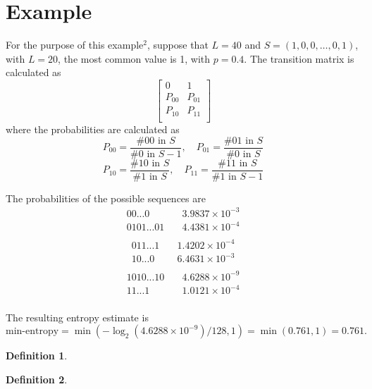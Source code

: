 \documentclass[12pt,openany]{book}
\theoremstyle{definition}
\newtheorem{definition}{Definition}[chapter]
\begin{document}
\section*{Example}
For the purpose of this example\(^2\), suppose that \(L = 40\) and \(S = (1, 0, 0, \ldots, 0, 1)\), with \(L = 20\), the most common value is 1, with \(p = 0.4\). The transition matrix is calculated as
\[
\begin{bmatrix}
	0 & 1 \\
	P_{00} & P_{01} \\
	P_{10} & P_{11} \\
\end{bmatrix}
\]
where the probabilities are calculated as
\[
P_{00} = \frac{\#00 \text{ in } S}{\#0 \text{ in } S - 1}, \quad P_{01} = \frac{\#01 \text{ in } S}{\#0 \text{ in } S}
\]
\[
P_{10} = \frac{\#10 \text{ in } S}{\#1 \text{ in } S}, \quad P_{11} = \frac{\#11 \text{ in } S}{\#1 \text{ in } S - 1}
\]

The probabilities of the possible sequences are
\[
\begin{aligned}
	00...0 &\quad 3.9837 \times 10^{-3} \\
	0101...01 &\quad 4.4381 \times 10^{-4} \\
\end{aligned}
\]
\[
\begin{aligned}
	011...1 &\quad 1.4202 \times 10^{-4} \\
	10...0 &\quad 6.4631 \times 10^{-3} \\
\end{aligned}
\]
\[
\begin{aligned}
	1010...10 &\quad 4.6288 \times 10^{-9} \\
	11...1 &\quad 1.0121 \times 10^{-4} \\
\end{aligned}
\]

The resulting entropy estimate is
\[ \text{min-entropy} = \min(-\log_2(4.6288 \times 10^{-9})/128, 1) = \min(0.761, 1) = 0.761. \]

\newpage

\begin{tcolorbox}[colback=white,colframe=defcolor,arc=5pt,title={\color{white}\bf }]
	\begin{definition}
		
	\end{definition}
\end{tcolorbox}

\begin{tcolorbox}[colback=white,colframe=defcolor,arc=5pt,title={\color{white}\bf }]
	\begin{definition}
		
	\end{definition}
\end{tcolorbox}
\end{document}

